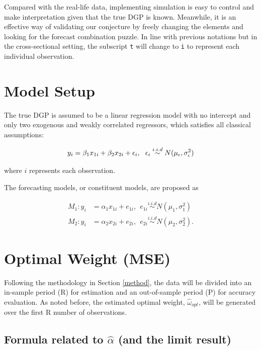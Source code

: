 \documentclass{monashthesis}
\begin{document}
Compared with the real-life data, implementing simulation is easy to control and make interpretation given that the true DGP is known. Meanwhile, it is an effective way of validating our conjecture by freely changing the elements and looking for the forecast combination puzzle. In line with previous notations but in the cross-sectional setting, the subscript \texttt{t} will change to \texttt{i} to represent each individual observation.

\hypertarget{model-setup}{%
\section{Model Setup}\label{model-setup}}

The true DGP is assumed to be a linear regression model with no intercept and only two exogenous and weakly correlated regressors, which satisfies all classical assumptions:

\begin{equation}
\label{eqn:DGP}
y_i = \beta_1 x_{1i} + \beta_2 x_{2i} + \epsilon_i, \ \ \epsilon_i \stackrel{i.i.d}{\sim} N(\mu_{\epsilon},\sigma^2_{\epsilon}) \\
\end{equation}

where \(i\) represents each observation.

The forecasting models, or constituent models, are proposed as

\begin{align}
M_1: y_i &= \alpha_1 x_{1i} + e_{1i}, \ \ e_{1i} \stackrel{i.i.d}{\sim} N(\mu_{1},\sigma^2_1) \\
M_2: y_i &= \alpha_2 x_{2i} + e_{2i}, \ \ e_{2i} \stackrel{i.i.d}{\sim} N(\mu_{2},\sigma^2_2).
\end{align}

\hypertarget{op}{%
\section{Optimal Weight (MSE)}\label{op}}

Following the methodology in Section \ref{method}, the data will be divided into an in-sample period (R) for estimation and an out-of-sample period (P) for accuracy evaluation. As noted before, the estimated optimal weight, \(\hat\omega_{opt}\), will be generated over the first R number of observations.

\hypertarget{formula-related-to-hatalpha-and-the-limit-result}{%
\subsection{\texorpdfstring{Formula related to \(\hat\alpha\) (and the limit result)}{Formula related to \textbackslash hat\textbackslash alpha (and the limit result)}}\label{formula-related-to-hatalpha-and-the-limit-result}}
\end{document}
